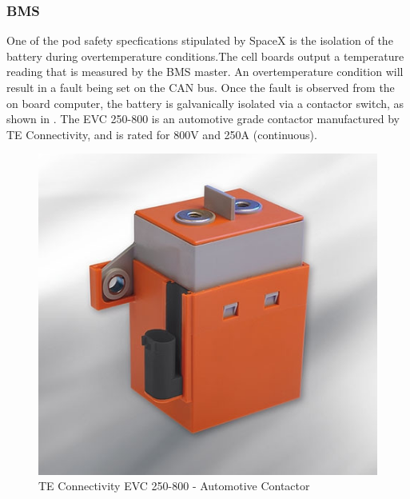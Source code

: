 \documentclass[main.tex]{subfiles}
\begin{document}
    \subsubsection{BMS}
    One of the pod safety specfications stipulated by SpaceX is the isolation of the battery during overtemperature conditions.The cell boards output a temperature reading that is measured by the BMS master. An overtemperature condition will result in a fault being set on the CAN bus. Once the fault is observed from the on board computer, the battery is galvanically isolated via a contactor switch, as shown in . The EVC 250-800 is an automotive grade contactor manufactured by TE Connectivity, and is rated for 800V and 250A (continuous).
    \begin{figure}[H]
        \centering
        \includegraphics[scale = 0.5]{images/contactor}
        \caption{TE Connectivity EVC 250-800 - Automotive Contactor }
        \label{fig:contactor}
    \end{figure}  
    
\end{document}
